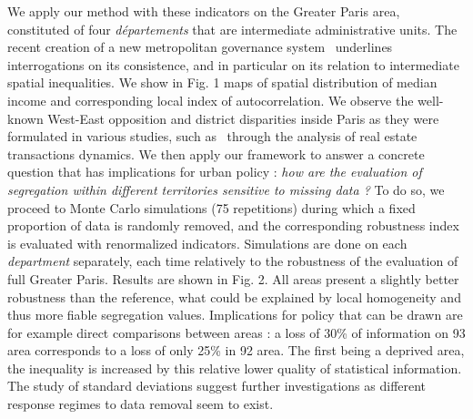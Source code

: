 \documentclass[runningheads,a4paper]{llncs2e/llncs}
\begin{document}
We apply our method with these indicators on the Greater Paris area, constituted of four \emph{d{\'e}partements} that are intermediate administrative units. The recent creation of a new metropolitan governance system~\cite{gilli2009paris} underlines interrogations on its consistence, and in particular on its relation to intermediate spatial inequalities. We show in Fig. 1 maps of spatial distribution of median income and corresponding local index of autocorrelation. We observe the well-known West-East opposition and district disparities inside Paris as they were formulated in various studies, such as~\cite{guerois2009dynamique} through the analysis of real estate transactions dynamics. We then apply our framework to answer a concrete question that has implications for urban policy : \textit{how are the evaluation of segregation within different territories sensitive to missing data ?} To do so, we proceed to Monte Carlo simulations (75 repetitions) during which a fixed proportion of data is randomly removed, and the corresponding robustness index is evaluated with renormalized indicators. Simulations are done on each \emph{department} separately, each time relatively to the robustness of the evaluation of full Greater Paris. Results are shown in Fig. 2. All areas present a slightly better robustness than the reference, what could be explained by local homogeneity and thus more fiable segregation values. Implications for policy that can be drawn are for example direct comparisons between areas : a loss of 30\% of information on 93 area corresponds to a loss of only 25\% in 92 area. The first being a deprived area, the inequality is increased by this relative lower quality of statistical information. The study of standard deviations suggest further investigations as different response regimes to data removal seem to exist.
\end{document}
